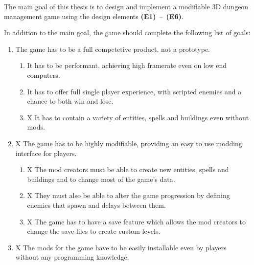 The main goal of this thesis is to design and implement a modifiable 3D dungeon management game using the design elements \textbf{(E1)}~--~\textbf{(E6)}.

In addition to the main goal, the game should complete the following list of goals:

\begin{enumerate}[label=\textbf{(G\arabic*)}]
    \item The game has to be a full competetive product, not a prototype.
        \begin{enumerate}[label=\textbf{(G1.\arabic*)}]
            \item It has to be performant, achieving high framerate even on low end computers.
            \item It has to offer full single player experience, with scripted enemies and a chance to both win and lose.
            \item X It has to contain a variety of entities, spells and buildings even without mods.
        \end{enumerate}
    \item X The game has to be highly modifiable, providing an easy to use modding interface for players.
        \begin{enumerate}[label=\textbf{(G2.\arabic*)}]
            \item X The mod creators must be able to create new entities, spells and buildings and to change most of the game's data.
            \item X They must also be able to alter the game progression by defining enemies that spawn and delays between them.
            \item X The game has to have a save feature which allows the mod creators to change the save files to create custom levels.
        \end{enumerate}
    \item X The mods for the game have to be easily installable even by players without any programming knowledge. 
\end{enumerate}
